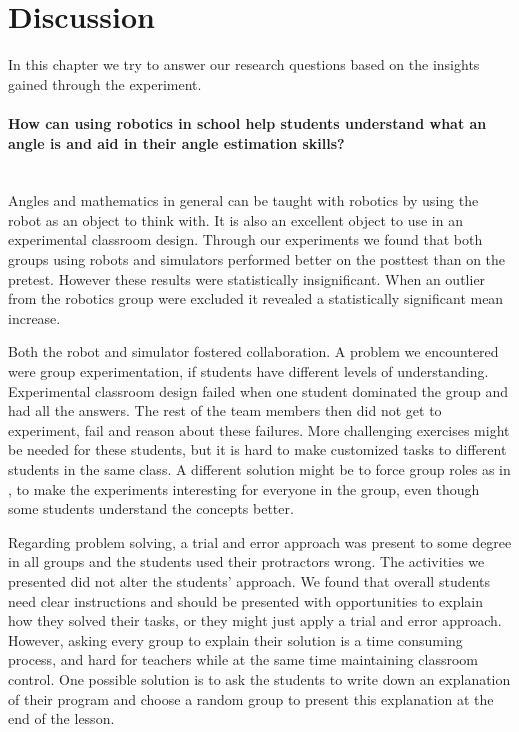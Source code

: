 \section{Discussion}
In this chapter we try to answer our research questions based on the insights gained through the experiment. 

\paragraph{How can using robotics in school help students understand what an angle is and aid in their angle estimation skills?}~\\
Angles and mathematics in general can be taught with robotics by using the robot as an object to think with. It is also an excellent object to use in an experimental classroom design. Through our experiments we found that both groups using robots and simulators performed better on the posttest than on the pretest. However these results were statistically insignificant. When an outlier from the robotics group were excluded it revealed a statistically significant mean increase. 

\bigskip\noindent
Both the robot and simulator fostered collaboration. A problem we encountered were group experimentation, if students have different levels of understanding. Experimental classroom design failed when one student dominated the group and had all the answers. The rest of the team members then did not get to experiment, fail and reason about these failures. More challenging exercises might be needed for these students, but it is hard to make customized tasks to different students in the same class. A different solution might be to force group roles as in \cite{mitnik2009collaborative}, to make the experiments interesting for everyone in the group, even though some students understand the concepts better.

\bigskip\noindent
Regarding problem solving, a trial and error approach was present to some degree in all groups and the students used their protractors wrong. The activities we presented did not alter the students' approach. We found that overall students need clear instructions and should be presented with opportunities to explain how they solved their tasks, or they might just apply a trial and error approach. However, asking every group to explain their solution is a time consuming process, and hard for teachers while at the same time maintaining classroom control. One possible solution is to ask the students to write down an explanation of their program and choose a random group to present this explanation at the end of the lesson.

